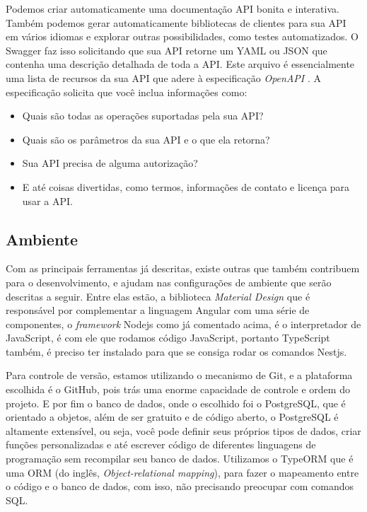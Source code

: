 Podemos criar automaticamente uma documentação API bonita e interativa. Também podemos gerar automaticamente bibliotecas de clientes para sua API em vários idiomas e explorar outras possibilidades, como testes automatizados. O Swagger faz isso solicitando que sua API retorne um YAML ou JSON que contenha uma descrição detalhada de toda a API. Este arquivo é essencialmente uma lista de recursos da sua API que adere à especificação \textit{OpenAPI} \cite{shockey2020Swagger}. A especificação solicita que você inclua informações como:

\begin{itemize}
    \item Quais são todas as operações suportadas pela sua API? 
    \item Quais são os parâmetros da sua API e o que ela retorna?   
    \item Sua API precisa de alguma autorização?
    \item E até coisas divertidas, como termos, informações de contato e licença para usar a API.
\end{itemize}

\subsection{Ambiente}
Com as principais ferramentas já descritas, existe outras que também contribuem para o desenvolvimento, e ajudam nas configurações de ambiente que serão descritas a seguir. Entre elas estão, a biblioteca \textit{Material Design} que é responsável por complementar a linguagem Angular com uma série de componentes, o \textit{framework} Nodejs como já comentado acima, é o interpretador de JavaScript, é com ele que rodamos código JavaScript, portanto TypeScript também, é preciso ter instalado para que se consiga rodar os comandos Nestjs. 

Para controle de versão, estamos utilizando o mecanismo de Git, e a plataforma escolhida é o GitHub, pois trás uma enorme capacidade de controle e ordem do projeto. E por fim o banco de dados, onde o escolhido foi o PostgreSQL, que é orientado a objetos, além de ser gratuito e de código aberto, o PostgreSQL é altamente extensível, ou seja, você pode definir seus próprios tipos de dados, criar funções personalizadas e até escrever código de diferentes linguagens de programação sem recompilar seu banco de dados. Utilizamos o TypeORM que é uma ORM (do inglês, \textit{Object-relational mapping}), para fazer o mapeamento entre o código e o banco de dados, com isso, não precisando preocupar com comandos SQL.


\
